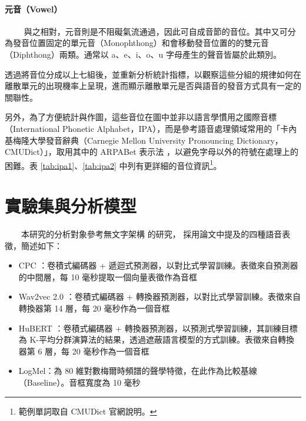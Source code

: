 {{\paragraph{元音（Vowel）} \hfill \break
　　
        與之相對，元音則是不阻礙氣流通過，因此可自成音節的音位。其中又可分為發音位置固定的單元音（Monophthong）和會移動發音位置的的雙元音（Diphthong）兩類。通常以 a、e、i、o、u 字母產生的聲音皆屬於此類別。
        
        透過將音位分成以上七組後，並重新分析統計指標，以觀察這些分組的規律如何在離散單元的出現機率上呈現，進而顯示離散單元是否與語音的發音方式具有一定的關聯性。

        另外，為了方便統計與作圖，這些音位在圖中並非以語言學慣用之國際音標（International Phonetic Alphabet，IPA）\cite{international1999handbook}，而是參考語音處理領域常用的「卡內基梅隆大學發音辭典（Carnegie Mellon University Pronouncing Dictionary，CMUDict）\cite{noauthor_cmu_nodate}」，取用其中的 ARPABet 表示法 \cite{klautau2001arpabet}，以避免字母以外的符號在處理上的困難。表 \ref{tab:ipa1}、\ref{tab:ipa2} 中列有更詳細的音位資訊\footnote{範例單詞取自 CMUDict 官網說明。}。



\section{實驗集與分析模型}

　　本研究的分析對象參考無文字架構 \cite{noauthor_textless_2021, lakhotia_generative_2021, lakhotia_generative_2021-1} 的研究，
採用論文中提及的四種語音表徵，簡述如下：

\begin{itemize}
    \item CPC \cite{rivière2020unsupervised}：卷積式編碼器 + 遞迴式預測器，以對比式學習訓練。表徵來自預測器的中間層，每 10 毫秒提取一個向量表徵作為音框
    \item Wav2vec 2.0 \cite{baevski2020wav2vec}：卷積式編碼器 + 轉換器預測器，以對比式學習訓練。表徵來自轉換器第 14 層，每 20 毫秒作為一個音框
    \item HuBERT \cite{hsu_hubert_2021-2}：卷積式編碼器 + 轉換器預測器，以預測式學習訓練，其訓練目標為 K-平均分群演算法的結果，透過遮蔽語言模型的方式訓練。表徵來自轉換器第 6 層，每 20 毫秒作為一個音框
    \item LogMel：為 80 維對數梅爾時頻譜的聲學特徵，在此作為比較基線（Baseline）。音框寬度為 10 毫秒
\end{itemize}

}}
